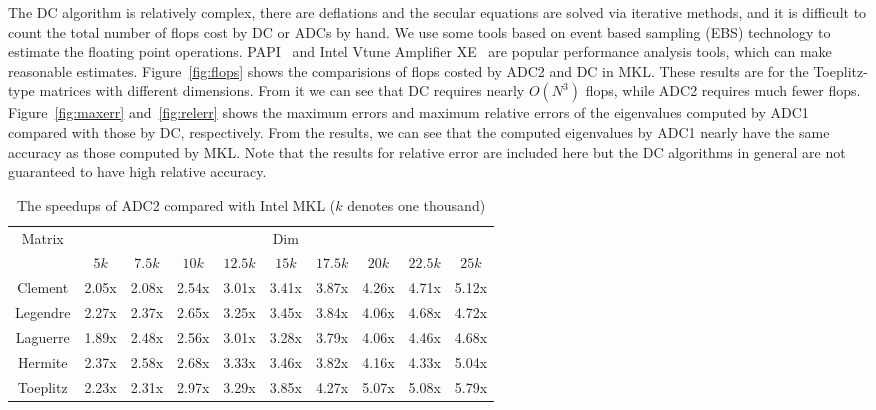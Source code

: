 \documentclass[times]{nlaauth}
\newcounter{algorithm}
\begin{document}
The DC algorithm is relatively complex, there are deflations and the secular
equations are solved via iterative methods,
and it is difficult to count the total number of flops cost by DC or ADCs by hand.
We use some tools based on event based sampling (EBS) technology to estimate the floating point operations.
PAPI~\cite{papi_web} and Intel Vtune Amplifier XE~\cite{vtune_web} are popular performance analysis tools, which can make reasonable estimates.
Figure~\ref{fig:flops} shows the comparisions of flops costed by ADC2 and DC in MKL.
These results are for the Toeplitz-type matrices with different dimensions.
From it we can see that DC requires nearly $O(N^3)$ flops, while
ADC2 requires much fewer flops.
Figure~\ref{fig:maxerr} and~\ref{fig:relerr} shows the maximum errors and maximum relative errors of the eigenvalues
computed by ADC1 compared with those by DC, respectively.
From the results, we can see that the computed eigenvalues by ADC1 nearly have the same accuracy as those computed by MKL.
Note that the results for relative error are included here but the DC algorithms in general are
not guaranteed to have high relative accuracy.

\begin{table}[ptbh]
\caption{The speedups of {ADC2} compared with Intel MKL ($k$ denotes one thousand)}
\label{tab:Ex2-rhss}
\begin{center}\begin{tabular}
[c]{|c|ccccccccc|}\hline
\multirow{2}{*}{Matrix}  & \multicolumn{9}{c|}{Dim} \\ \cline{2-10}
  & $5k$ & $7.5k$& $10k$ & $12.5k$ & $15k$ & $17.5k$ & $20k$ &$22.5k$ & $25k$  \\ \hline \hline
Clement  & 2.05x & 2.08x & 2.54x & 3.01x & 3.41x & 3.87x & 4.26x & 4.71x & 5.12x   \\
Legendre & 2.27x & 2.37x & 2.65x & 3.25x & 3.45x & 3.84x & 4.06x & 4.68x & 4.72x  \\
Laguerre & 1.89x & 2.48x & 2.56x & 3.01x & 3.28x & 3.79x & 4.06x & 4.46x & 4.68x \\
Hermite  & 2.37x & 2.58x & 2.68x & 3.33x & 3.46x & 3.82x & 4.16x & 4.33x & 5.04x  \\
Toeplitz & 2.23x & 2.31x & 2.97x & 3.29x & 3.85x & 4.27x & 5.07x & 5.08x & 5.79x \\ \hline
\end{tabular}
\end{center}
\end{table}
\end{document}
